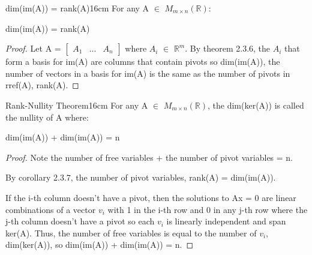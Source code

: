     \newpage



    \begin{corollary}{dim(im(A)) = rank(A)}{16cm}
        For any A $\in$ $M_{m \times n}(\mathbb{R})$:

        \hspace{0.5cm}
        dim(im(A)) = rank(A)
    \end{corollary}

    \begin{proof}
        Let A =
        $\begin{bmatrix}
            A_1 & ... & A_n 
        \end{bmatrix}$ where $A_i$ $\in$ $\mathbb{R}^m$.
        By {\color{red} theorem 2.3.6}, the $A_i$ that form a basis for im(A)
        are columns that contain pivots so dim(im(A)),
        the number of vectors in a basis for im(A) is the
        same as the number of pivots in rref(A), rank(A).
    \end{proof}

    \vspace{0.5cm}



    \begin{wtheorem}{Rank-Nullity Theorem}{16cm}
        For any A $\in$ $M_{m \times n}(\mathbb{R})$,
        the dim(ker(A)) is called the {\color{lblue} nullity} of A where:

        \hspace{0.5cm}
        dim(im(A)) + dim(im(A)) = n
    \end{wtheorem}

    \begin{proof}
        Note the number of free variables + the number of pivot variables = n.

        By {\color{orange} corollary 2.3.7},
        the number of pivot variables, rank(A) = dim(im(A)).
        
        If the i-th column doesn't have a pivot, then the solutions to Ax = 0
        are linear combinations of a vector $v_i$ with 1 in the i-th row
        and 0 in any j-th row where the j-th column doesn't have a pivot
        so each $v_i$ is linearly independent and span ker(A).
        Thus, the number of free variables is equal to
        the number of $v_i$, dim(ker(A)), so dim(im(A)) + dim(im(A)) = n.
    \end{proof}

    \vspace{0.5cm}





